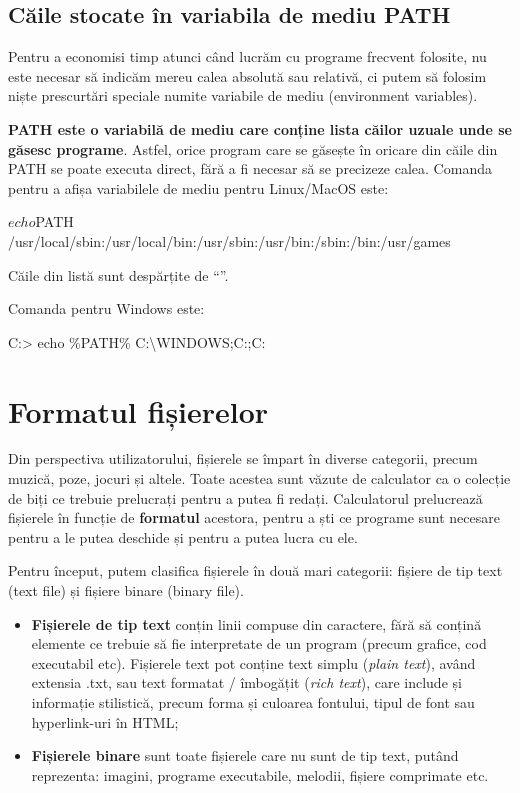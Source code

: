 \subsection{Căile stocate în variabila de mediu PATH}

Pentru a economisi timp atunci când lucrăm cu programe frecvent folosite, nu
este necesar să indicăm mereu calea absolută sau relativă, ci putem să folosim
niște prescurtări speciale numite variabile de mediu (environment variables).

\textbf{PATH este o variabilă de mediu care conține lista căilor uzuale unde se
găsesc programe}.  Astfel, orice program care se găsește în oricare din căile
din PATH se poate executa direct, fără a fi necesar să se precizeze calea.
Comanda pentru a afișa variabilele de mediu pentru Linux/MacOS este:

\begin{screen}
$ echo $PATH
/usr/local/sbin:/usr/local/bin:/usr/sbin:/usr/bin:/sbin:/bin:/usr/games
\end{screen}

Căile din listă sunt despărțite de “\file{:}”.

Comanda pentru Windows este:

\begin{screen}
C:> echo \%PATH\%
C:\textbackslash{}WINDOWS;C:\WINDOWS;C:\WINDOWS{}\Wbem
\end{screen}

\section{Formatul fișierelor}

Din perspectiva utilizatorului, fișierele se împart în diverse categorii, precum
muzică, poze, jocuri și altele. Toate acestea sunt văzute de calculator ca o
colecție de biți ce trebuie prelucrați pentru a putea fi redați. Calculatorul
prelucrează fișierele în funcție de \textbf{formatul} acestora, pentru a ști ce
programe sunt necesare pentru a le putea deschide și pentru a putea lucra cu
ele.

Pentru început, putem clasifica fișierele în două mari categorii: fișiere de tip
text (text file) și fișiere binare (binary file).

\begin{itemize}
	\item \textbf{Fișierele de tip text} conțin linii compuse din caractere,
		fără să conțină elemente ce trebuie să fie interpretate de un
		program (precum grafice, cod executabil etc).  Fișierele text
		pot conține text simplu (\textit{plain text}), având extensia
		.txt, sau text formatat / îmbogățit (\textit{rich text}), care
		include și informație stilistică, precum forma și culoarea
		fontului, tipul de font sau hyperlink-uri în HTML;
	\item \textbf{Fișierele binare} sunt toate fișierele care nu sunt de tip
		text, putând reprezenta: imagini, programe executabile, melodii,
		fișiere comprimate etc.
\end{itemize}

